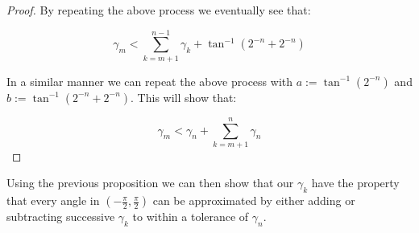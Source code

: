 {\begin{proof}
By repeating the above process we eventually see that:

\[\gamma_m < \sum_{k=m+1}^{n-1} \gamma_k + \tan^{-1}(2^{-n} + 2^{-n})\]

In a similar manner we can repeat the above process with \(a := \tan^{-1}(2^{-n})\) and \(b := \tan^{-1}(2^{-n} + 2^{-n})\). This will show that:

\begin{displaymath}
	\gamma_m < \gamma_n + \sum_{k=m+1}^{n}\gamma_n
\end{displaymath}

\end{proof}

Using the previous proposition we can then show that our \(\gamma_k\) have the property that every angle in \((-\frac{\pi}{2}, \frac{\pi}{2})\) can be approximated by either adding or subtracting successive \(\gamma_k\) to within a tolerance of \(\gamma_n\).

}
